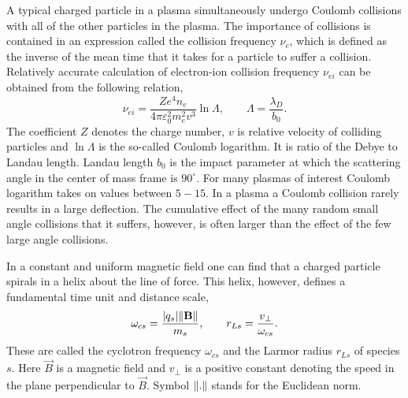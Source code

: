 A typical charged particle in a plasma simultaneously undergo Coulomb collisions with all of the other particles in the plasma. The importance of collisions is contained in an expression called the collision frequency $ \nu_c $, which is defined as the inverse of the mean time that it takes for a particle to suffer a collision. Relatively accurate calculation of electron-ion collision frequency $ \nu_{ei} $ can be obtained from the following relation,
\begin{equation}
\label{2.1.6}
\nu_{ei} = \frac{Z e^4 n_e}{4 \pi \varepsilon_0^2 m_e^2 v^3} \ln{\Lambda}, \qquad \Lambda = \frac{\lambda_D}{b_0}.
\end{equation}
The coefficient $ Z $ denotes the charge number, $ v $ is relative velocity of colliding particles and $ \ln \Lambda $ is the so-called Coulomb logarithm. It is ratio of the Debye to Landau length. Landau length $ b_0 $ is the impact parameter at which the scattering angle in the center of mass frame is $ 90^\circ $. For many plasmas of interest Coulomb logarithm takes on values between $ 5 - 15 $. In a plasma a Coulomb collision rarely results in a large deflection. The cumulative effect of the many random small angle collisions that it suffers, however, is often larger than the effect of the few large angle collisions.

In a constant and uniform magnetic field one can find that a charged particle spirals in a helix about the line of force. This helix, however, defines a fundamental time unit and distance scale,
\begin{equation}
\label{2.1.7}
\omega_{cs} = \frac{\lvert q_{s}\rvert \lVert\mathbf{B}\rVert}{m_{s}}, \qquad r_{Ls} = \frac{v_\perp}{\omega_{cs}}.
\end{equation}
These are called the cyclotron frequency $ \omega_{cs} $ and the Larmor radius $ r_{Ls} $ of species $ s $. Here $ \vec{B} $ is a magnetic field and $ v_\perp $ is a positive constant denoting the speed in the plane perpendicular to $ \vec{B} $. Symbol $ \lVert.\rVert $ stands for the Euclidean norm.
